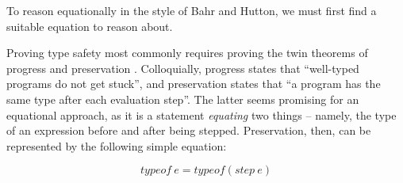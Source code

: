\documentclass[manuscript,screen,review,sigplan]{acmart}
\begin{document}
To reason equationally in the style of Bahr and Hutton, we must first find a
suitable equation to reason about.

Proving type safety most commonly requires proving the twin theorems of
progress and preservation \cite{harper:pfpl}. Colloquially, progress states
that ``well-typed programs do not get stuck'', and preservation states that
``a program has the same type after each evaluation step''. The latter seems
promising for an equational approach, as it is a statement \emph{equating} two
things -- namely, the type of an expression before and after being stepped.
Preservation, then, can be represented by the following simple equation:

\begin{equation}
  typeof\ e = typeof (step\ e)
\end{equation}



\end{document}
